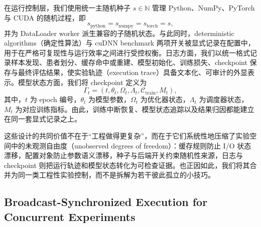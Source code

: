 在运行控制层，我们使用统一主随机种子 $s \in \mathbb{N}$ 管理 Python、NumPy、PyTorch 与 CUDA 的随机过程，即
\begin{equation}
    s_{\mathrm{python}} = s_{\mathrm{numpy}} = s_{\mathrm{torch}} = s,
\end{equation}
并为 DataLoader worker 派生兼容的子随机状态。与此同时，deterministic algorithms（确定性算法）与 cuDNN benchmark 两项开关被显式记录在配置中，用于在严格可复现性与运行效率之间进行受控权衡。日志方面，我们以统一格式记录样本发现、患者划分、缓存命中或重建、模型初始化、训练损失、checkpoint 保存与最终评估结果，使实验轨迹（execution trace）具备文本化、可审计的外显表示。模型状态方面，我们将 checkpoint 定义为
\begin{equation}
    \Gamma_t = (t, \theta_t, \Omega_t, \Lambda_t, \mathcal{C}_{\mathrm{train}}, M_t),
\end{equation}
其中，$t$ 为 epoch 编号，$\theta_t$ 为模型参数，$\Omega_t$ 为优化器状态，$\Lambda_t$ 为调度器状态，$M_t$ 为对应训练指标。由此，训练中断恢复、模型状态追踪以及结果归因都能建立在同一套显式记录之上。

这些设计的共同价值不在于“工程做得更复杂”，而在于它们系统性地压缩了实验空间中的未观测自由度（unobserved degrees of freedom）：缓存规则防止 I/O 状态漂移，配置对象防止参数语义漂移，种子与后端开关约束随机性来源，日志与 checkpoint 则把运行轨迹和模型状态转化为可检查证据。也正因如此，我们将其合并为同一类工程性实验控制，而不是拆解为若干彼此孤立的小技巧。

\subsection{Broadcast-Synchronized Execution for Concurrent Experiments}
\label{subsec:broadcast_synchronized_execution}

